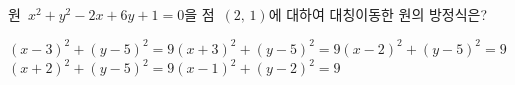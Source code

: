 원~$x^2+y^2-2x+6y+1=0$을 점~$(2,\,1)$에 대하여 대칭이동한 원의 방정식은?
\begin{choicesii}{$(x-3)^2+(y-5)^2=9$}{$(x+3)^2+(y-5)^2=9$}{$(x-2)^2+(y-5)^2=9$}{$(x+2)^2+(y-5)^2=9$}{$(x-1)^2+(y-2)^2=9$}\end{choicesii}
